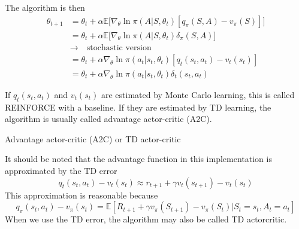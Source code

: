 \documentclass[10pt]{elegantbook}
\begin{document}
The algorithm is then
\begin{equation}
    \begin{aligned}
        \theta_{t+1} &= \theta_t + \alpha \mathbb E \big [ \nabla_{\theta} \ln \pi(A|S,\theta_{t}) [q_{\pi}(S,A) - v_{\pi}(S)] \big ] \\
        &= \theta_t + \alpha \mathbb E \big [ \nabla_{\theta} \ln \pi(A|S,\theta_{t}) \delta_{\pi}(S,A) \big ] \\
        &\rightarrow \quad \text{stochastic version} \\
        &= \theta_{t}+\alpha\nabla_{\theta}\ln\pi(a_{t}|s_{t},\theta_{t})[q_{t}(s_{t},a_{t})-v_{t}(s_{t})] \\
        &= \theta_{t}+\alpha\nabla_{\theta}\ln\pi(a_{t}|s_{t},\theta_{t})\delta_{t}(s_{t},a_{t})
    \end{aligned}
\end{equation}

If $q_t(s_t, a_t)$ and $v_t(s_t)$ are estimated by Monte Carlo learning, this is
called REINFORCE with a baseline. If they are estimated by TD learning,
the algorithm is usually called advantage actor-critic (A2C).

\vspace{\baselineskip}

\begin{algorithm}[H]
\caption{Advantage actor-critic (A2C) or TD actor-critic}

\end{algorithm}

\vspace{\baselineskip}

It should be noted that the advantage function in this
implementation is approximated by the TD error
\[
    q_{t}(s_{t},a_{t})-v_{t}(s_{t})\approx r_{t+1}+\gamma v_{t}(s_{t+1})-v_{t}(s_{t})
\]
This approximation is reasonable because
\[
    q_{\pi}(s_{t},a_{t})-v_{\pi}(s_{t})=\mathbb{E}\left[R_{t+1}+\gamma v_{\pi}(S_{t+1})-v_{\pi}(S_{t})\vert S_{t}=s_{t},A_{t}=a_{t}\right]
\]
When we use the TD error, the algorithm may also be called TD actorcritic.
\end{document}
